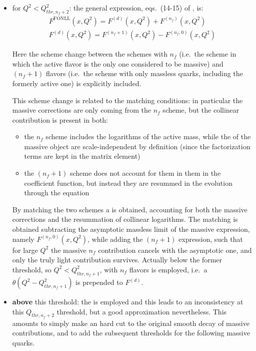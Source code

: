 \begin{itemize}
  \item for \textbf{$Q^2 < Q_{thr,n_f+2}^2$}: the general expression,
    eqs.~(14-15) of \cite{Forte:2010ta}, is:
    \begin{align}
        F^{\text{FONLL}}(x, Q^2) = F^{(d)}(x, Q^2) + F^{(n_f)}(x, Q^2)\\
        F^{(d)}(x, Q^2) = F^{(n_f + 1)}(x, Q^2) - F^{(n_f, 0)}(x, Q^2)
        \label{eq:dis/fonll}
    \end{align}

    Here the scheme change between the schemes with $n_f$ (i.e.\ the \ffns
    scheme in which the active flavor is the only one considered to be massive)
    and $(n_f + 1)$ flavors (i.e.\ the \ffns scheme with only massless quarks,
    including the formerly active one) is explicitly included.

    This scheme change is related to the \dglap matching conditions: in
    particular the massive corrections are only coming from the $n_f$
    scheme, but the collinear contribution is present in both:
    \begin{itemize}
      \item the $n_f$ scheme includes the logarithms of the active mass,
          while the \pdf of the massive object are scale-independent by definition
          (since the factorization terms are kept in the matrix element)
      \item the $(n_f + 1)$ scheme does not account for them in them in the coefficient
          function, but instead they are resummed in the \pdf evolution through the
          \dglap equation
    \end{itemize}

    By matching the two schemes a \gmvfns is obtained, accounting for both the
    massive corrections and the resummation of collinear logarithms.
    The matching is obtained subtracting the asymptotic massless limit of the
    massive expression, namely $F^{(n_f, 0)}(x, Q^2)$, while adding the
    $(n_f + 1)$ expression, such that for large $Q^2$ the massive
    $n_f$ contribution cancels with the asymptotic one, and only the truly
    light contribution survives.
    Actually below the former threshold, so $Q^2 < Q_{thr,n_f+1}^2$, \fns
    with $n_f$ flavors is employed, i.e.\ a $\theta(Q^2 - Q_{thr,n_f+1}^2)$ is
    prepended to $F^{(d)}$.

  \item \textbf{above} this threshold: the \zmvfns is employed and this leads
    to an inconsistency at this $Q_{thr,n_f+2}$ threshold, but a good
    approximation nevertheless.
    This amounts to simply make an hard cut to the original smooth decay of
    massive contributions, and to add the subsequent thresholds for the following
    massive quarks.
\end{itemize}

